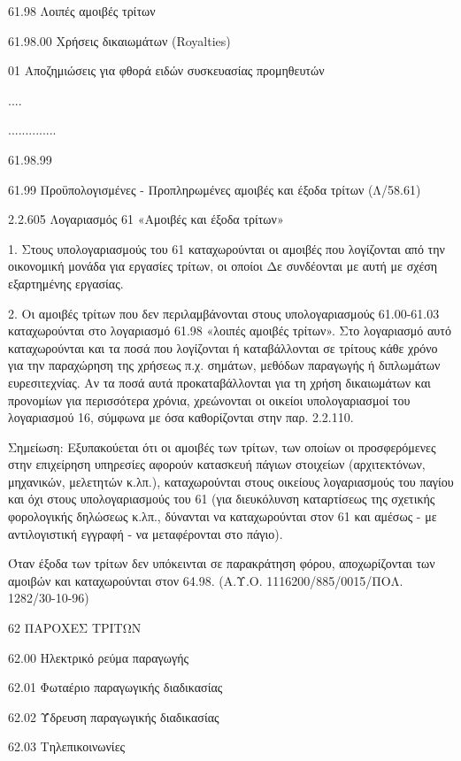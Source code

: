 \documentclass[A4,10pt,greek]{book}
\begin{document}
        61.98   Λοιπές αμοιβές τρίτων

                     61.98.00    Χρήσεις δικαιωμάτων (Royalties)

                                01   Αποζημιώσεις για φθορά ειδών συσκευασίας προμηθευτών

                                ....

                     ..............

                     61.98.99

        61.99   Προϋπολογισμένες - Προπληρωμένες αμοιβές και έξοδα τρίτων
                     (Λ/58.61)

2.2.605 Λογαριασμός 61 «Αμοιβές και έξοδα τρίτων»

1. Στους υπολογαριασμούς του 61 καταχωρούνται οι αμοιβές που λογίζονται από την οικονομική μονάδα για εργασίες τρίτων, οι οποίοι Δε συνδέονται με αυτή με σχέση εξαρτημένης εργασίας.

2. Οι αμοιβές τρίτων που δεν περιλαμβάνονται στους υπολογαριασμούς 61.00-61.03 καταχωρούνται στο λογαριασμό 61.98 «λοιπές αμοιβές τρίτων». Στο λογαριασμό αυτό καταχωρούνται και τα ποσά που λογίζονται ή καταβάλλονται σε τρίτους κάθε χρόνο για την παραχώρηση της χρήσεως π.χ. σημάτων, μεθόδων παραγωγής ή διπλωμάτων ευρεσιτεχνίας. Αν τα ποσά αυτά προκαταβάλλονται για τη χρήση δικαιωμάτων και προνομίων για περισσότερα χρόνια, χρεώνονται οι οικείοι υπολογαριασμοί του λογαριασμού 16, σύμφωνα με όσα καθορίζονται στην παρ. 2.2.110.

Σημείωση: Εξυπακούεται ότι οι αμοιβές των τρίτων, των οποίων οι προσφερόμενες στην επιχείρηση υπηρεσίες αφορούν κατασκευή πάγιων στοιχείων (αρχιτεκτόνων, μηχανικών, μελετητών κ.λπ.), καταχωρούνται στους οικείους λογαριασμούς του παγίου και όχι στους υπολογαριασμούς του 61 (για διευκόλυνση καταρτίσεως της σχετικής φορολογικής δηλώσεως κ.λπ., δύνανται να καταχωρούνται στον 61 και αμέσως - με αντιλογιστική εγγραφή - να μεταφέρονται στο πάγιο).

Όταν έξοδα των τρίτων δεν υπόκεινται σε παρακράτηση φόρου, αποχωρίζονται των αμοιβών και καταχωρούνται στον 64.98.  (Α.Υ.Ο. 1116200/885/0015/ΠΟΛ. 1282/30-10-96)

 62   ΠΑΡΟΧΕΣ ΤΡΙΤΩΝ

        62.00   Ηλεκτρικό ρεύμα παραγωγής

        62.01   Φωταέριο παραγωγικής διαδικασίας

        62.02   Ύδρευση παραγωγικής διαδικασίας

        62.03   Τηλεπικοινωνίες
\end{document}
